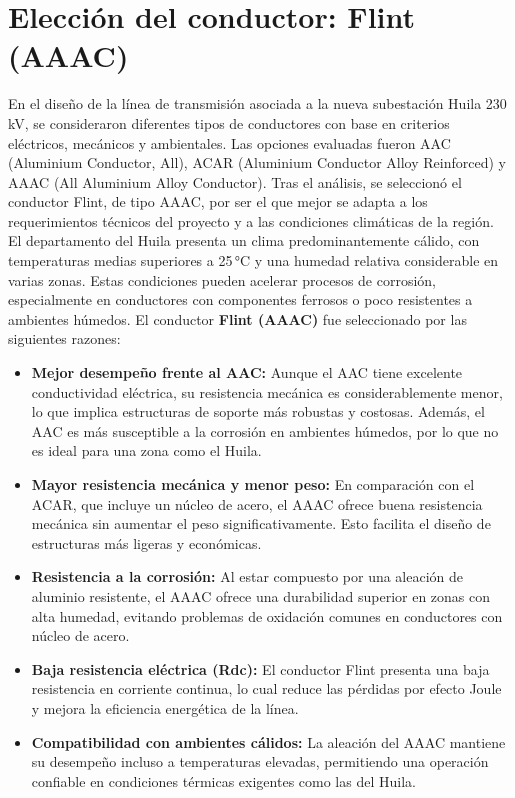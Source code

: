 \section{Elección del conductor: Flint (AAAC)}

En el diseño de la línea de transmisión asociada a la nueva subestación Huila 230 kV, se consideraron diferentes tipos de conductores con base en criterios eléctricos, mecánicos y ambientales. Las opciones evaluadas fueron AAC (Aluminium Conductor, All), ACAR (Aluminium Conductor Alloy Reinforced) y AAAC (All Aluminium Alloy Conductor). Tras el análisis, se seleccionó el conductor Flint, de tipo AAAC, por ser el que mejor se adapta a los requerimientos técnicos del proyecto y a las condiciones climáticas de la región. \\ El departamento del Huila presenta un clima predominantemente cálido, con temperaturas medias superiores a 25 °C y una humedad relativa considerable en varias zonas. Estas condiciones pueden acelerar procesos de corrosión, especialmente en conductores con componentes ferrosos o poco resistentes a ambientes húmedos.
El conductor \textbf{Flint (AAAC)} fue seleccionado por las siguientes razones:

\begin{itemize}
    \item \textbf{Mejor desempeño frente al AAC:} Aunque el AAC tiene excelente conductividad eléctrica, su resistencia mecánica es considerablemente menor, lo que implica estructuras de soporte más robustas y costosas. Además, el AAC es más susceptible a la corrosión en ambientes húmedos, por lo que no es ideal para una zona como el Huila.
    
    \item \textbf{Mayor resistencia mecánica y menor peso:} En comparación con el ACAR, que incluye un núcleo de acero, el AAAC ofrece buena resistencia mecánica sin aumentar el peso significativamente. Esto facilita el diseño de estructuras más ligeras y económicas.
    
    \item \textbf{Resistencia a la corrosión:} Al estar compuesto por una aleación de aluminio resistente, el AAAC ofrece una durabilidad superior en zonas con alta humedad, evitando problemas de oxidación comunes en conductores con núcleo de acero.
    
    \item \textbf{Baja resistencia eléctrica (Rdc):} El conductor Flint presenta una baja resistencia en corriente continua, lo cual reduce las pérdidas por efecto Joule y mejora la eficiencia energética de la línea.
    
    \item \textbf{Compatibilidad con ambientes cálidos:} La aleación del AAAC mantiene su desempeño incluso a temperaturas elevadas, permitiendo una operación confiable en condiciones térmicas exigentes como las del Huila.
\end{itemize}


